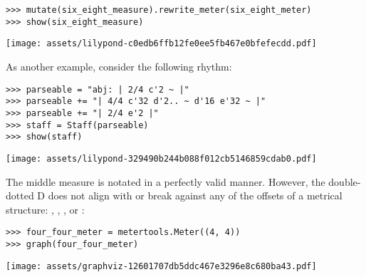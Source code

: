 \begin{abjadbookoutput}
\begin{singlespacing}
\vspace{-0.5\baselineskip}
\begin{verbatim}
>>> mutate(six_eight_measure).rewrite_meter(six_eight_meter)
>>> show(six_eight_measure)
\end{verbatim}
\noindent\texttt{[image: assets/lilypond-c0edb6ffb12fe0ee5fb467e0bfefecdd.pdf]}
\end{singlespacing}
\end{abjadbookoutput}

\noindent As another example, consider the following rhythm:

\begin{comment}
<abjad>
parseable = "abj: | 2/4 c'2 ~ |"
parseable += "| 4/4 c'32 d'2.. ~ d'16 e'32 ~ |"
parseable += "| 2/4 e'2 |"
staff = Staff(parseable)
show(staff)
</abjad>
\end{comment}

\begin{abjadbookoutput}
\begin{singlespacing}
\vspace{-0.5\baselineskip}
\begin{verbatim}
>>> parseable = "abj: | 2/4 c'2 ~ |"
>>> parseable += "| 4/4 c'32 d'2.. ~ d'16 e'32 ~ |"
>>> parseable += "| 2/4 e'2 |"
>>> staff = Staff(parseable)
>>> show(staff)
\end{verbatim}
\noindent\texttt{[image: assets/lilypond-329490b244b088f012cb5146859cdab0.pdf]}
\end{singlespacing}
\end{abjadbookoutput}

\noindent The middle measure is notated in a perfectly valid manner. However,
the double-dotted D does not align with or break against any of the offsets of
a  metrical structure: , , ,
 or :

\begin{comment}
<abjad>
four_four_meter = metertools.Meter((4, 4))
graph(four_four_meter)
</abjad>
\end{comment}

\begin{abjadbookoutput}
\begin{singlespacing}
\vspace{-0.5\baselineskip}
\begin{verbatim}
>>> four_four_meter = metertools.Meter((4, 4))
>>> graph(four_four_meter)
\end{verbatim}
\noindent\texttt{[image: assets/graphviz-12601707db5ddc467e3296e8c680ba43.pdf]}
\end{singlespacing}
\end{abjadbookoutput}

